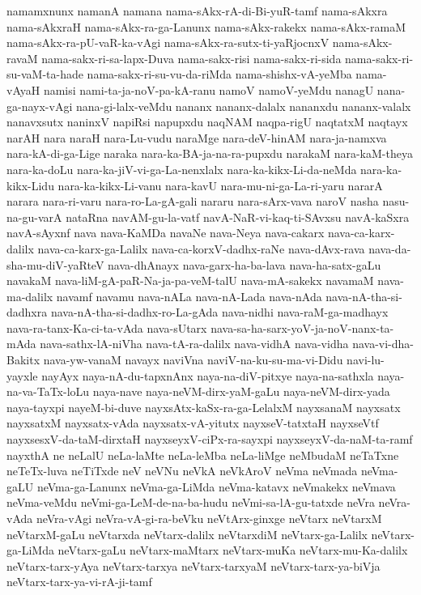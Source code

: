 {namamxnunx
namanA
namana
nama-sAkx-rA-di-Bi-yuR-tamf
nama-sAkxra
nama-sAkxraH
nama-sAkx-ra-ga-Lanunx
nama-sAkx-rakekx
nama-sAkx-ramaM
nama-sAkx-ra-pU-vaR-ka-vAgi
nama-sAkx-ra-sutx-ti-yaRjocnxV
nama-sAkx-ravaM
nama-sakx-ri-sa-lapx-Duva
nama-sakx-risi
nama-sakx-ri-sida
nama-sakx-ri-su-vaM-ta-hade
nama-sakx-ri-su-vu-da-riMda
nama-shishx-vA-yeMba
nama-vAyaH
namisi
nami-ta-ja-noV-pa-kA-ranu
namoV
namoV-yeMdu
nanagU
nana-ga-nayx-vAgi
nana-gi-lalx-veMdu
nananx
nananx-dalalx
nananxdu
nananx-valalx
nanavxsutx
naninxV
napiRsi
napupxdu
naqNAM
naqpa-rigU
naqtatxM
naqtayx
narAH
nara
naraH
nara-Lu-vudu
naraMge
nara-deV-hinAM
nara-ja-namxva
nara-kA-di-ga-Lige
naraka
nara-ka-BA-ja-na-ra-pupxdu
narakaM
nara-kaM-theya
nara-ka-doLu
nara-ka-jiV-vi-ga-La-nenxlalx
nara-ka-kikx-Li-da-neMda
nara-ka-kikx-Lidu
nara-ka-kikx-Li-vanu
nara-kavU
nara-mu-ni-ga-La-ri-yaru
nararA
narara
nara-ri-varu
nara-ro-La-gA-gali
nararu
nara-sArx-vava
naroV
nasha
nasu-na-gu-varA
nataRna
navAM-gu-la-vatf
navA-NaR-vi-kaq-ti-SAvxsu
navA-kaSxra
navA-sAyxnf
nava
nava-KaMDa
navaNe
nava-Neya
nava-cakarx
nava-ca-karx-dalilx
nava-ca-karx-ga-Lalilx
nava-ca-korxV-dadhx-raNe
nava-dAvx-rava
nava-da-sha-mu-diV-yaRteV
nava-dhAnayx
nava-garx-ha-ba-lava
nava-ha-satx-gaLu
navakaM
nava-liM-gA-paR-Na-ja-pa-veM-talU
nava-mA-sakekx
navamaM
nava-ma-dalilx
navamf
navamu
nava-nALa
nava-nA-Lada
nava-nAda
nava-nA-tha-si-dadhxra
nava-nA-tha-si-dadhx-ro-La-gAda
nava-nidhi
nava-raM-ga-madhayx
nava-ra-tanx-Ka-ci-ta-vAda
nava-sUtarx
nava-sa-ha-sarx-yoV-ja-noV-nanx-ta-mAda
nava-sathx-lA-niVha
nava-tA-ra-dalilx
nava-vidhA
nava-vidha
nava-vi-dha-Bakitx
nava-yw-vanaM
navayx
naviVna
naviV-na-ku-su-ma-vi-Didu
navi-lu-yayxle
nayAyx
naya-nA-du-tapxnAnx
naya-na-diV-pitxye
naya-na-sathxla
naya-na-va-TaTx-loLu
naya-nave
naya-neVM-dirx-yaM-gaLu
naya-neVM-dirx-yada
naya-tayxpi
nayeM-bi-duve
nayxsAtx-kaSx-ra-ga-LelalxM
nayxsanaM
nayxsatx
nayxsatxM
nayxsatx-vAda
nayxsatx-vA-yitutx
nayxseV-tatxtaH
nayxseVtf
nayxsesxV-da-taM-dirxtaH
nayxseyxV-ciPx-ra-sayxpi
nayxseyxV-da-naM-ta-ramf
nayxthA
ne
neLalU
neLa-laMte
neLa-leMba
neLa-liMge
neMbudaM
neTaTxne
neTeTx-luva
neTiTxde
neV
neVNu
neVkA
neVkAroV
neVma
neVmada
neVma-gaLU
neVma-ga-Lanunx
neVma-ga-LiMda
neVma-katavx
neVmakekx
neVmava
neVma-veMdu
neVmi-ga-LeM-de-na-ba-hudu
neVmi-sa-lA-gu-tatxde
neVra
neVra-vAda
neVra-vAgi
neVra-vA-gi-ra-beVku
neVtArx-ginxge
neVtarx
neVtarxM
neVtarxM-gaLu
neVtarxda
neVtarx-dalilx
neVtarxdiM
neVtarx-ga-Lalilx
neVtarx-ga-LiMda
neVtarx-gaLu
neVtarx-maMtarx
neVtarx-muKa
neVtarx-mu-Ka-dalilx
neVtarx-tarx-yAya
neVtarx-tarxya
neVtarx-tarxyaM
neVtarx-tarx-ya-biVja
neVtarx-tarx-ya-vi-rA-ji-tamf
}

